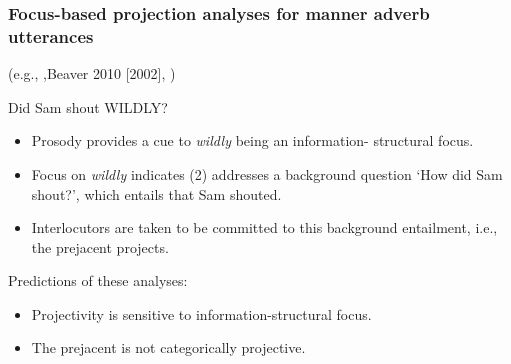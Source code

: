 \documentclass[pdf,xcolor=table,envcountsect,handout]{beamer}
\begin{document}
\begin{frame}
\frametitle{Focus-based projection analyses for manner adverb utterances}

\begin{tiny} (e.g., \citealt{simons01},Beaver 2010 [2002]\nocite{beaver-belly}, \citealt{abrusan2013,brst-ar,best-question,stevens-etal2017}) \end{tiny}

\begin{exe}
 Did Sam shout WILDLY?
\end{exe}

\pause

\begin{itemize}[topsep=-5pt,leftmargin=5ex]

\item Prosody provides a cue to {\em wildly} being an information- structural focus.

\pause

\item Focus on {\em wildly} indicates (2) addresses a background question `How did Sam shout?', which entails that Sam shouted. 

\pause

\item Interlocutors are taken to be committed to this background entailment, i.e., the prejacent projects.

\end{itemize}

\bigskip
\pause

Predictions of these analyses:

\begin{itemize}[topsep=-3pt,leftmargin=5ex]

\item Projectivity is sensitive to information-structural focus.

\item The prejacent is not categorically projective. 

\end{itemize}

\end{frame}
\end{document}
